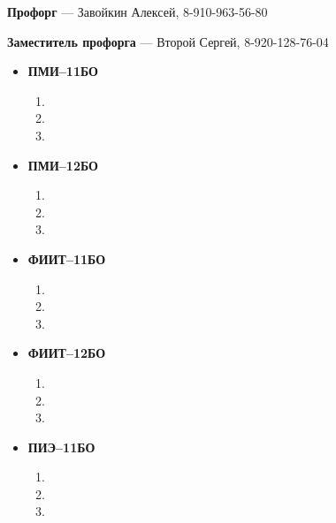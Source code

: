 
\par \textbf{Профорг} --- Завойкин Алексей, 8-910-963-56-80\\
\par \textbf{Заместитель профорга} --- Второй Сергей, 8-920-128-76-04




\begin{itemize}
\item \textbf{ПМИ--11БО}
	\begin{enumerate}
	\item 
	\item 
	\item 
	\end{enumerate}
\item \textbf{ПМИ--12БО}
	\begin{enumerate}
	\item 
	\item 
	\item 
	\end{enumerate}
\item \textbf{ФИИТ--11БО}
	\begin{enumerate}
	\item 
	\item 
	\item 
	\end{enumerate}
\item \textbf{ФИИТ--12БО}
	\begin{enumerate}
	\item 
	\item 
	\item 
	\end{enumerate}
\item \textbf{ПИЭ--11БО}
	\begin{enumerate}
	\item 
	\item 
	\item 
	\end{enumerate}
\end{itemize}



\newpage
{}

